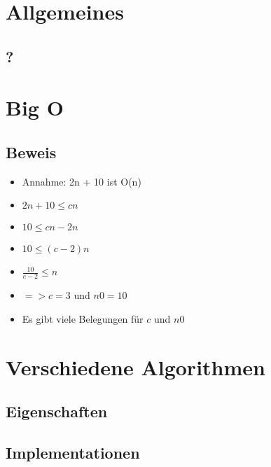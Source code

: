 

\newcommand{\SUBJECT}{}
\newcommand{\TITLE}{Cheat Sheet Objektorientierte Programmierung 2}



% 

\begin{multicols*}{5}
    \setlength{\columnseprule}{0.4pt}
		\footnotesize
		
% 

\section{Allgemeines}
	\subsection{?}
		
		
\section{Big O}

	\subsection{Beweis}
	\begin{itemize}
		\item Annahme: 2n + 10 ist O(n)
		\item $2n + 10 \leq cn$
		\item $10 \leq cn - 2n$
		\item $10 \leq (c - 2)n$
		\item $\frac{10}{c-2} \leq n$
		\item $=> c=3$ und $n0=10$
		\item Es gibt viele Belegungen für $c$ und $n0$
	\end{itemize}

\section{Verschiedene Algorithmen}
	\subsection{Eigenschaften}
	
	\subsection{Implementationen}

\end{multicols*}
